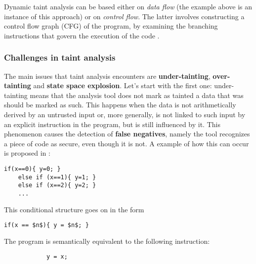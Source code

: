 \documentclass[12pt,a4paper]{book}
\theoremstyle{definition}
\begin{document}
	Dynamic taint analysis can be based either on \textit{data flow} (the example above is an instance of this approach) or on \textit{control flow}. The latter involves constructing a control flow graph (CFG) of the program, by examining the branching instructions that govern the execution of the code \cite{Dai2018}.
	
	\subsubsection{Challenges in taint analysis}
	The main issues that taint analysis encounters are \textbf{under-tainting}, \textbf{over-tainting} and \textbf{state space explosion}. Let's start with the first one: under-tainting means that the analysis tool does not mark as tainted a data that was should be marked as such. This happens when the data is not arithmetically derived by an untrusted input or, more generally, is not linked to such input by an explicit instruction in the program, but is still influenced by it. This phenomenon causes the detection of \textbf{false negatives}, namely the tool recognizes a piece of code as secure, even though it is not. A example of how this can occur is proposed in \cite{Newsome2005}:
	
	\vspace{3mm}
	\begin{minipage}{.4\textwidth}
		\begin{lstlisting}
if(x==0){ y=0; } 
	else if (x==1){ y=1; } 
	else if (x==2){ y=2; } 
	...
		\end{lstlisting}
	\end{minipage}
	
	This conditional structure goes on in the form
	
	\vspace{3mm}
	\begin{minipage}{.3\textwidth}
		\begin{lstlisting}[mathescape=true]
if(x == $n$){ y = $n$; }
		\end{lstlisting}
	\end{minipage}
	
	The program is semantically equivalent to the following instruction:
	
	\vspace{3mm}
	\begin{minipage}{.15\textwidth}
		\begin{lstlisting}
			y = x;
		\end{lstlisting}
	\end{minipage}
	
\end{document}
